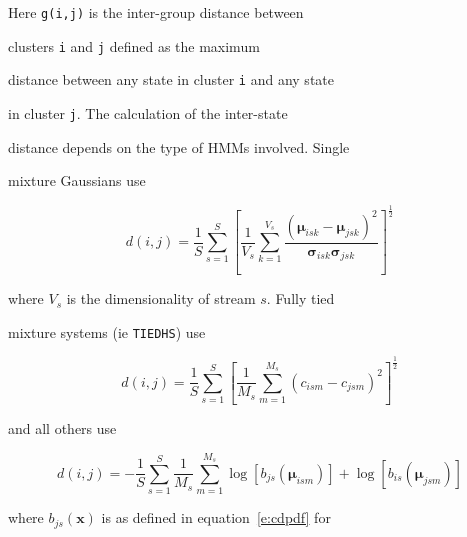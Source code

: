 Here \texttt{g(i,j)} is the inter-group distance between


clusters \texttt{i} and \texttt{j} defined as the maximum


distance between any state in cluster \texttt{i} and any state


in cluster \texttt{j}.  The calculation of the inter-state


distance depends on the type of HMMs involved.  Single


mixture Gaussians use


\begin{equation}


  d(i,j) = \frac{1}{S} \sum_{s=1}^S


        \left[  


           \frac{1}{V_s} \sum_{k=1}^{V_s}


                 \frac{(\bm{\mu}_{isk} - \bm{\mu}_{jsk})^2}{


                         \bm{\sigma}_{isk}\bm{\sigma}_{jsk}}


        \right]^{\frac{1}{2}}


\end{equation}


where $V_s$ is the dimensionality of stream $s$.  Fully tied


mixture systems (ie \texttt{TIEDHS}) use


\begin{equation}


  d(i,j) = \frac{1}{S} \sum_{s=1}^S


        \left[  


           \frac{1}{M_s} \sum_{m=1}^{M_s}


                (c_{ism} - c_{jsm})^2


        \right]^{\frac{1}{2}}


\end{equation}


and all others use


\begin{equation}


  d(i,j) = - \frac{1}{S} \sum_{s=1}^S


         \frac{1}{M_s} \sum_{m=1}^{M_s}


          \log[b_{js}(\bm{\mu}_{ism})] + \log[b_{is}(\bm{\mu}_{jsm})]


\end{equation}


where $b_{js}(\bm{x})$ is as defined in equation~\ref{e:cdpdf} for


